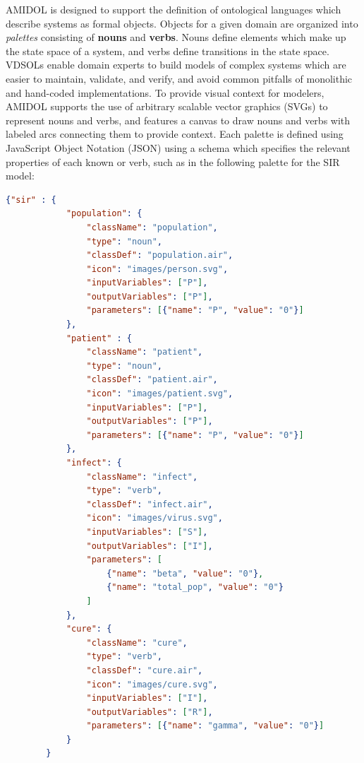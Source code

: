 \documentclass[11pt]{article}
\newcommand{\amidol}{\textsc{AMIDOL}}
\begin{document}
\amidol{} is designed to support the definition of ontological languages which describe systems as formal objects.  Objects for a given domain are organized into \emph{palettes} consisting of \textbf{nouns} and \textbf{verbs}.  Nouns define elements which make up the state space of a system, and verbs define transitions in the state space.  VDSOLs enable domain experts to build models of complex systems which are easier to maintain, validate, and verify, and avoid common pitfalls of monolithic and hand-coded implementations.  To provide visual context for modelers, \amidol{} supports the use of arbitrary scalable vector graphics (SVGs) to represent nouns and verbs, and features a canvas to draw nouns and verbs with labeled arcs connecting them to provide context.  Each palette is defined using JavaScript Object Notation (JSON) using a schema which specifies the relevant properties of each known or verb, such as in the following palette for the SIR model:

\begin{lstlisting}[language=json, caption=JSON Definition of SIR VDSOL Palette]
         {"sir" : {
            "population": {
                "className": "population",
                "type": "noun",
                "classDef": "population.air",
                "icon": "images/person.svg",
                "inputVariables": ["P"],
                "outputVariables": ["P"],
                "parameters": [{"name": "P", "value": "0"}]
            }, 
            "patient" : {
                "className": "patient",
                "type": "noun",
                "classDef": "patient.air",
                "icon": "images/patient.svg",
                "inputVariables": ["P"],
                "outputVariables": ["P"],
                "parameters": [{"name": "P", "value": "0"}]
            }, 
            "infect": {
                "className": "infect",
                "type": "verb",
                "classDef": "infect.air",
                "icon": "images/virus.svg",
                "inputVariables": ["S"],
                "outputVariables": ["I"],
                "parameters": [
                    {"name": "beta", "value": "0"},
                    {"name": "total_pop", "value": "0"}
                ]
            },
            "cure": {
                "className": "cure",
                "type": "verb",
                "classDef": "cure.air",
                "icon": "images/cure.svg",
                "inputVariables": ["I"],
                "outputVariables": ["R"],
                "parameters": [{"name": "gamma", "value": "0"}]
            }
        }
\end{lstlisting}
\end{document}
